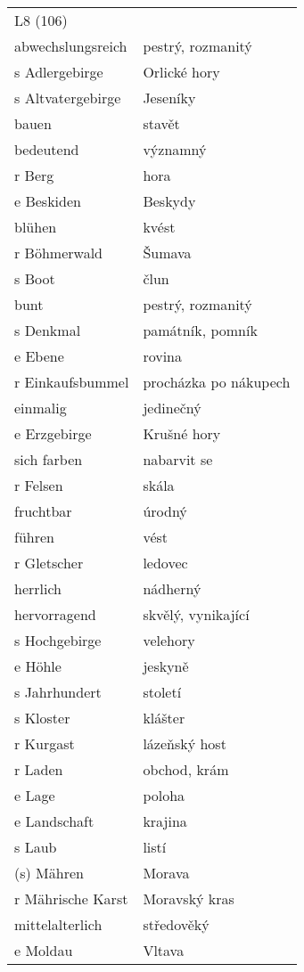\documentclass{article}
\begin{document}
\begin{tabular}{ p{5cm}|p{5cm}  }
    \\
    L8 (106) \\
    abwechslungsreich & pestrý, rozmanitý\\
    s Adlergebirge & Orlické hory\\
    s Altvatergebirge & Jeseníky\\
    bauen & stavět\\
    bedeutend & významný\\
    r Berg & hora\\
    e Beskiden & Beskydy\\
    blühen & kvést\\
    r Böhmerwald & Šumava\\
    s Boot & člun\\
    bunt & pestrý, rozmanitý\\
    s Denkmal & památník, pomník\\
    e Ebene & rovina\\
    r Einkaufsbummel & procházka po nákupech\\
    einmalig & jedinečný\\
    e Erzgebirge & Krušné hory\\
    sich farben & nabarvit se\\
    r Felsen & skála\\
    fruchtbar & úrodný\\
    führen & vést\\
    r Gletscher & ledovec\\
    herrlich & nádherný\\
    hervorragend & skvělý, vynikající\\
    s Hochgebirge & velehory\\
    e Höhle & jeskyně\\
    s Jahrhundert & století\\
    s Kloster & klášter\\
    r Kurgast & lázeňský host\\
    r Laden & obchod, krám\\
    e Lage & poloha\\
    e Landschaft & krajina\\
    s Laub & listí\\
    (s) Mähren & Morava\\
    r Mährische Karst & Moravský kras\\
    mittelalterlich & středověký\\
    e Moldau & Vltava\\

\end{tabular}
\end{document}
